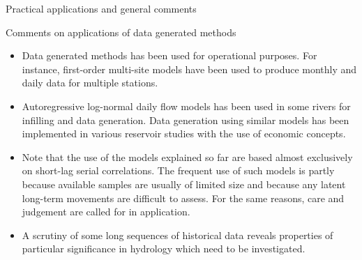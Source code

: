 \documentclass[8pt]{beamer}
\renewcommand{\emph}[1]{\textcolor{myorange}{#1}}
\begin{document}
\begin{frame}{Practical applications and general comments}
    \begin{block}{Comments on applications of data generated methods}
    \end{block}
    \begin{itemize}
        \item \emph{Data generated methods} has been used for \emph{operational purposes}. For instance, \emph{first-order multi-site models} have been used to produce monthly and daily data for multiple stations. 
        \item \emph{Autoregressive log-normal} daily flow models has been used in some rivers for \emph{infilling and data generation}. Data generation using similar models has been implemented in various reservoir studies with the use of economic concepts. 
        \item Note that the use of the models explained so far  are based almost exclusively on \emph{short-lag serial correlations}. The frequent use of such models is partly because available samples are usually  of limited size  and because any latent \emph{long-term movements} are difficult  to assess. For the same reasons, care and judgement are called for in application. 
        \item A scrutiny  of some long sequences of historical data reveals properties  of particular significance in hydrology which need to be investigated. 
    \end{itemize}
\end{frame}
\end{document}
